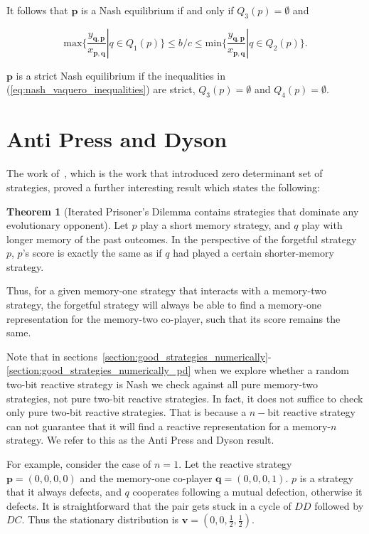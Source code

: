 \documentclass{article}
\theoremstyle{definition}
\newtheorem{theorem}{Theorem}[section]
\begin{document}
It follows that \(\mathbf{p}\) is a Nash equilibrium if and only if \(Q_3(p) = \emptyset\)
and

\begin{equation}\label{eq:nash_vaquero_inequalities}
  \text{max}\{ \frac{y_{\mathbf{q}, \mathbf{p}}}{x_{\mathbf{p}, \mathbf{q}}} | q \in Q_1(p) \} \leq b / c  \leq \text{min}\{\frac{y_{\mathbf{q}, \mathbf{p}}}{x_{\mathbf{p}, \mathbf{q}}} | q \in Q_2(p) \}.
\end{equation}

\(\mathbf{p}\) is a strict Nash equilibrium if the inequalities in
(\ref{eq:nash_vaquero_inequalities}) are strict, \(Q_3(p) = \emptyset\) and
\(Q_4(p) = \emptyset\).

\section{Anti Press and Dyson}

The work of~\citep{press:PNAS:2012}, which is the work that introduced
zero determinant set of strategies, proved a further interesting result which
states the following:

\begin{theorem}[Iterated Prisoner's Dilemma contains strategies that dominate any evolutionary opponent]
  Let \(p\) play a short memory strategy, and \(q\) play with longer memory of
  the past outcomes. In the perspective of the forgetful strategy \(p\), \(p\)'s
  score is exactly the same as if \(q\) had played a certain shorter-memory
  strategy.
\end{theorem}

Thus, for a given memory-one strategy that interacts with a memory-two strategy,
the forgetful strategy will always be able to find a memory-one representation
for the memory-two co-player, such that its score remains the same.

Note that in sections~\ref{section:good_strategies_numerically}-
\ref{section:good_strategies_numerically_pd} when we explore whether a random
two-bit reactive strategy is Nash we check against all pure memory-two
strategies, not pure two-bit reactive strategies. In fact, it does not
suffice to check only pure two-bit reactive strategies.
That is because a \(n-\)bit reactive strategy can not guarantee that it will
find a reactive representation for a memory-\(n\) strategy. We refer to this
as the Anti Press and Dyson result.

For example, consider the case of \(n=1\). Let the reactive strategy
\(\mathbf{p} = (0, 0, 0, 0)\) and the memory-one co-player \(\mathbf{q} = (0, 0,
0, 1)\). \(p\) is a strategy that it always defects, and \(q\) cooperates
following a mutual defection, otherwise it defects. It is straightforward that
the pair gets stuck in a cycle of \(DD\) followed by \(DC\). Thus the stationary
distribution is \(\mathbf{v} = (0, 0, \frac{1}{2}, \frac{1}{2})\).
\end{document}
